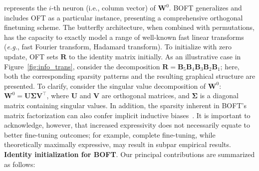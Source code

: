 represents the $i$-th neuron (i.e., column vector) of $\bm{W}^0$. BOFT generalizes and includes OFT as a particular instance, presenting a comprehensive orthogonal finetuning scheme. The butterfly architecture, when combined with permutations, has the capacity to exactly model a range of well-known fast linear transforms~\cite{dao2019learning,dao2019kaleidoscope} (\emph{e.g.}, fast Fourier transform, Hadamard transform). To initialize with zero update, OFT sets $\bm{R}$ to the identity matrix initially. As an illustrative case in Figure~\ref{fig:info_trans}, consider the decomposition $\bm{R}=\bm{B}_5\bm{B}_4\bm{B}_3\bm{B}_2\bm{B}_1$; here, both the corresponding sparsity patterns and the resulting graphical structure are presented. To clarify, consider the singular value decomposition of $\bm{W}^0$: $\bm{W}^0=\bm{U}\bm{\Sigma}\bm{V}^\top$, where $\bm{U}$ and $\bm{V}$ are orthogonal matrices, and $\bm{\Sigma}$ is a diagonal matrix containing singular values. In addition, the sparsity inherent in BOFT’s matrix factorization can also confer implicit inductive biases~\cite{gunasekar2017implicit,li2018algorithmic,liu2019neural}. It is important to acknowledge, however, that increased expressivity does not necessarily equate to better fine-tuning outcomes; for example, complete fine-tuning, while theoretically maximally expressive, may result in subpar empirical results. \textbf{Identity initialization for BOFT}. Our principal contributions are summarized as follows:

